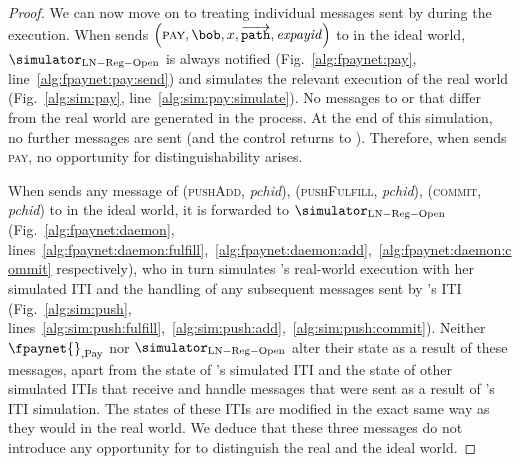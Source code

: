 \begin{proof}
  We can now move on to treating individual messages sent by \environment{}
  during the execution. When \environment{} sends $\left(\textsc{pay}, \bob, x,
  \overrightarrow{\mathtt{path}}, \mathit{expayid}\right)$ to \alice{}
  in the ideal world, $\simulator_{\mathrm{LN - Reg - Open}}$ is always notified
  (Fig.~\ref{alg:fpaynet:pay}, line~\ref{alg:fpaynet:pay:send}) and simulates
  the relevant execution of the real world (Fig.~\ref{alg:sim:pay},
  line~\ref{alg:sim:pay:simulate}). No messages to \ledger{} or \environment{}
  that differ from the real world are generated in the process. At the end of
  this simulation, no further messages are sent (and the control returns to
  \environment). Therefore, when \environment{} sends \textsc{pay}, no
  opportunity for distinguishability arises.

  When \environment{} sends any message of (\textsc{pushAdd}, \textit{pchid}),
  (\textsc{pushFulfill}, \textit{pchid}), (\textsc{commit}, \textit{pchid}) to
  \alice{} in the ideal world, it is forwarded to $\simulator_{\mathrm{LN - Reg
  - Open}}$ (Fig.~\ref{alg:fpaynet:daemon},
  lines~\ref{alg:fpaynet:daemon:fulfill},~\ref{alg:fpaynet:daemon:add},~\ref{alg:fpaynet:daemon:commit}
  respectively), who in turn simulates \alice's real-world execution with her
  simulated ITI and the handling of any subsequent messages sent by \alice's ITI
  (Fig.~\ref{alg:sim:push},
  lines~\ref{alg:sim:push:fulfill},~\ref{alg:sim:push:add},~\ref{alg:sim:push:commit}).
  Neither $\fpaynet{}_{\mathrm{, Pay}}$ nor $\simulator_{\mathrm{LN - Reg -
  Open}}$ alter their state as a result of these messages, apart from the state
  of \alice's simulated ITI and the state of other simulated ITIs that receive
  and handle messages that were sent as a result of \alice's ITI simulation. The
  states of these ITIs are modified in the exact same way as they would in the
  real world. We deduce that these three messages do not introduce any
  opportunity for \environment{} to distinguish the real and the ideal world.


\end{proof}
